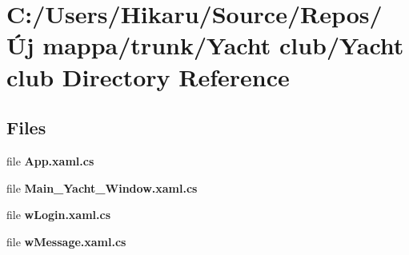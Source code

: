 \section{C\+:/\+Users/\+Hikaru/\+Source/\+Repos/Új mappa/trunk/\+Yacht club/\+Yacht club Directory Reference}
\label{dir_86dc1c9728723f00c7e49705facc0d75}
\subsection*{Files}
\begin{DoxyCompactItemize}
\item 
file \textbf{ App.\+xaml.\+cs}
\item 
file \textbf{ Main\+\_\+\+Yacht\+\_\+\+Window.\+xaml.\+cs}
\item 
file \textbf{ w\+Login.\+xaml.\+cs}
\item 
file \textbf{ w\+Message.\+xaml.\+cs}
\end{DoxyCompactItemize}
